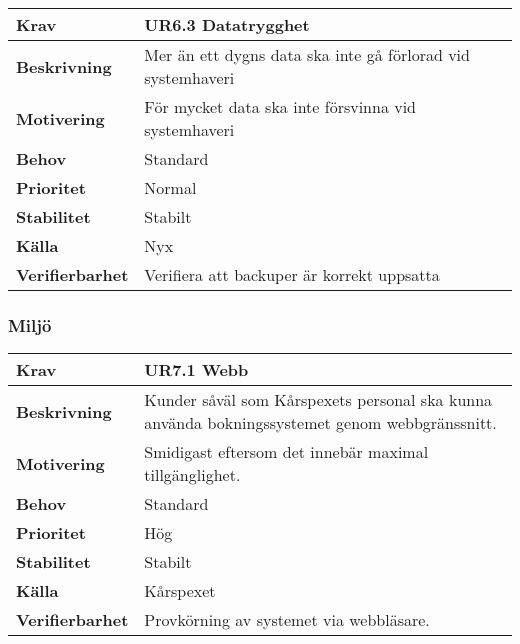 \documentclass[a4paper, twoside, 11pt, titlepage]{article}
\begin{document}
		\begin {table} [ht] \begin{tabular} { p{2.6cm} p{12.5cm} }
			\hline
			{\sffamily\textbf{Krav}} & {\sffamily\textbf{UR6.3 Datatrygghet}} \\
			\hline
			{\sffamily\textbf{Beskrivning}} & {Mer än ett dygns data ska inte gå förlorad vid systemhaveri} \\
			\hline
			{\sffamily\textbf{Motivering}} & {För mycket data ska inte försvinna vid systemhaveri} \\
			\hline
			{\sffamily\textbf{Behov}} & {Standard} \\
			\hline
			{\sffamily\textbf{Prioritet}} & {Normal} \\
			\hline
			{\sffamily\textbf{Stabilitet}} & {Stabilt} \\
			\hline
			{\sffamily\textbf{Källa}} & {Nyx} \\
			\hline
			{\sffamily\textbf{Verifierbarhet}} & {Verifiera att backuper är korrekt uppsatta } \\
			\hline
		\end{tabular} \end{table} \FloatBarrier


		\subsubsection{Miljö}


		\begin {table} [ht] \begin{tabular} { p{2.6cm} p{12.5cm} }
			\hline
			{\sffamily\textbf{Krav}} & {\sffamily\textbf{UR7.1 Webb}} \\
			\hline
			{\sffamily\textbf{Beskrivning}} & {Kunder såväl som Kårspexets personal ska kunna använda bokningssystemet genom webbgränssnitt.} \\
			\hline
			{\sffamily\textbf{Motivering}} & {Smidigast eftersom det innebär maximal tillgänglighet.} \\
			\hline
			{\sffamily\textbf{Behov}} & {Standard} \\
			\hline
			{\sffamily\textbf{Prioritet}} & {Hög} \\
			\hline
			{\sffamily\textbf{Stabilitet}} & {Stabilt} \\
			\hline
			{\sffamily\textbf{Källa}} & {Kårspexet} \\
			\hline
			{\sffamily\textbf{Verifierbarhet}} & {Provkörning av systemet via webbläsare.} \\
			\hline
		\end{tabular} \end{table} \FloatBarrier
		\vspace{6mm}
\end{document}
